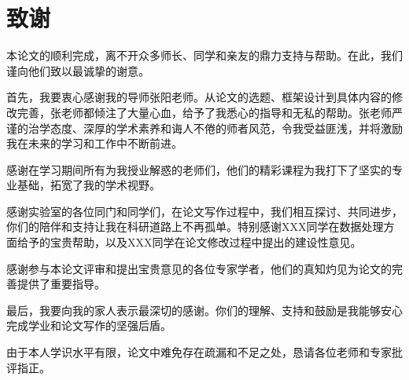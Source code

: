 \documentclass[12pt,a4paper]{article}
\begin{document}
\clearpage
\thispagestyle{empty} 
\section*{致谢} %

本论文的顺利完成，离不开众多师长、同学和亲友的鼎力支持与帮助。在此，我们谨向他们致以最诚挚的谢意。

首先，我要衷心感谢我的导师张阳老师。从论文的选题、框架设计到具体内容的修改完善，张老师都倾注了大量心血，给予了我悉心的指导和无私的帮助。张老师严谨的治学态度、深厚的学术素养和诲人不倦的师者风范，令我受益匪浅，并将激励我在未来的学习和工作中不断前进。

感谢在学习期间所有为我授业解惑的老师们，他们的精彩课程为我打下了坚实的专业基础，拓宽了我的学术视野。

感谢实验室的各位同门和同学们，在论文写作过程中，我们相互探讨、共同进步，你们的陪伴和支持让我在科研道路上不再孤单。特别感谢XXX同学在数据处理方面给予的宝贵帮助，以及XXX同学在论文修改过程中提出的建设性意见。

感谢参与本论文评审和提出宝贵意见的各位专家学者，他们的真知灼见为论文的完善提供了重要指导。

最后，我要向我的家人表示最深切的感谢。你们的理解、支持和鼓励是我能够安心完成学业和论文写作的坚强后盾。

由于本人学识水平有限，论文中难免存在疏漏和不足之处，恳请各位老师和专家批评指正。

\end{document}
